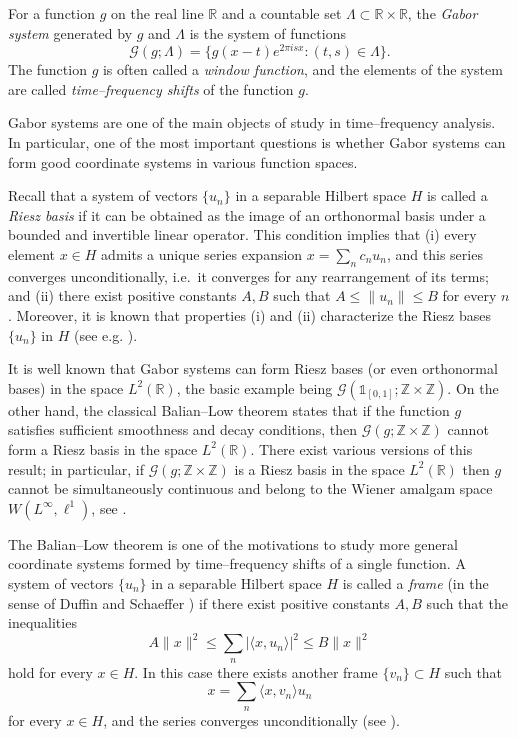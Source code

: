 \documentclass[reqno,a4paper,12pt]{amsart}
\numberwithin{equation}{section}
\numberwithin{figure}{section}
\newcommand\R{\mathbb{R}}
\newcommand\Z{\mathbb{Z}}
\newcommand\G{\mathcal{G}}
\newcommand\1{\mathds{1}}
\renewcommand\le{\leqslant}
\newcommand{\dotprod}[2]{\langle #1 , #2 \rangle}
\theoremstyle{plain}
\theoremstyle{definition}
\begin{document}
For a function $g$ on the real line $\R$ and a countable set $\Lambda\subset\R \times \R$, the \emph{Gabor system} generated by $g$ and $\Lambda$ is the system of functions 
\begin{equation}\label{eq:Gabordef}
\G(g;\Lambda)=\{ g(x-t)e^{2\pi i s x} : (t,s)\in\Lambda\}.
\end{equation}
The function $g$ is often called a \emph{window function}, and the elements of the system are called \emph{time--frequency shifts} of the function $g$.

Gabor systems are one of the main objects of study in time--frequency analysis. In particular, one of the most important questions is whether Gabor systems can form good coordinate systems in various function spaces.

Recall that a system of vectors $\{u_n\}$ in a separable Hilbert space $H$ 
is called a \emph{Riesz basis} if it can be obtained as the image of an orthonormal basis 
under a bounded and invertible linear operator. This condition implies that 
(i) every element $x\in H$ admits a unique series expansion
$x=\sum_{n}c_n u_n$, and this series converges
unconditionally, i.e.\ it converges for any rearrangement of its terms; and
(ii) there exist positive constants $A,B$ such that $A \le \|u_n\| \le B$ for every $n$.
Moreover, it is known that properties (i) and (ii) characterize the Riesz bases $\{u_n\}$ in $H$ 
(see e.g. \cite[Lemma 3.6.9]{Chr16}).

It is well known that Gabor systems can form Riesz bases (or even orthonormal bases) in the space $L^2(\R)$, the basic example being $\G(\1_{[0,1]};\Z\times\Z)$. On the other hand, the classical Balian--Low theorem states that if the function $g$ satisfies sufficient smoothness and decay conditions, then $\G(g; \Z \times \Z)$ cannot form a Riesz basis in the space $L^2(\R)$. There exist various versions of this result; in particular, if $\G(g; \Z\times \Z)$ is a Riesz basis in the space $L^2(\R)$ then $g$ cannot be simultaneously continuous and belong to the 
Wiener amalgam space $W(L^\infty, \ell^1)$, see \cite[Theorem 11.33]{Hei11}.

The Balian--Low theorem is one of the motivations to study more general coordinate systems formed by time--frequency shifts of a single function. A system of vectors $\{u_n\}$  in a separable Hilbert space $H$ 
is called a \emph{frame} (in the sense of  Duffin and Schaeffer \cite{DS52})
if there exist positive constants $A,B$  such that the inequalities
\begin{equation}\label{eq:frame_ineq}
A \|x\|^2 \le \sum_n |\langle x, u_n \rangle|^2\le B\|x\|^2
\end{equation}
hold for every $x\in H$. In this case there exists another frame
$\{v_n\}\subset H$ such that 
\begin{equation}\label{eq:frame_convergence}
x=\sum_{n} \dotprod{x}{v_n}u_n 
\end{equation}
for every $x \in H$,
and the series converges unconditionally
(see \cite[Section 4.7]{You01}).
\end{document}
